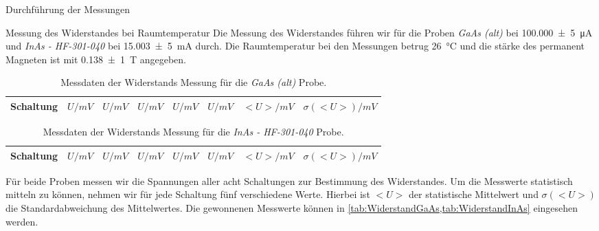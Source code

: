\documentclass[pdftex, a4paper,11pt, twoside, ngerman]{report}
\begin{document}
  \begin{chapter}{Durchführung der Messungen}
    \label{chp:Durchführung}
    
    
    
    \begin{section}{Messung des Widerstandes bei Raumtemperatur}
      \label{chp:MessungWiderstandRaumtemperatur}
      Die Messung des Widerstandes führen wir für die Proben
      \textit{GaAs (alt)} bei \SI{100,000(5)}{\micro\ampere} und
      \textit{InAs - HF-301-040} bei \SI{15,003(5)}{\milli\ampere} durch.
      Die Raumtemperatur bei den Messungen betrug \SI{26}{\celsius} und die
      stärke des permanent Magneten ist mit \SI{0,138(1)}{\tesla} angegeben.
      \begin{table}[hb]
        \centering
        \footnotesize
        \begin{tabular}{cccccccc}
          Schaltung & $U / mV$  & $U / mV$  & $U / mV$  & $U / mV$  & $U / mV$
               & $<U> / mV$  & $\sigma(<U>) / mV$ \\ \hline \hline
          
        \end{tabular}
        \caption{Messdaten der Widerstands Messung für die \textit{GaAs (alt)}
            Probe.}
        \label{tab:WiderstandGaAs}
      \end{table}
      \begin{table}[hb]
        \centering
        \footnotesize
        \begin{tabular}{cccccccc}
          Schaltung & $U / mV$  & $U / mV$  & $U / mV$  & $U / mV$  & $U / mV$
               & $<U> / mV$  & $\sigma(<U>) / mV$ \\ \hline \hline
          
        \end{tabular}
        \caption{Messdaten der Widerstands Messung für die
            \textit{InAs - HF-301-040} Probe.}
        \label{tab:WiderstandInAs}
      \end{table}
      Für beide Proben messen wir die Spannungen aller acht Schaltungen zur
      Bestimmung des Widerstandes. Um die Messwerte statistisch mitteln zu
      können, nehmen wir für jede Schaltung fünf verschiedene Werte.
      Hierbei ist $<U>$ der statistische Mittelwert und $\sigma(<U>)$ die
      Standardabweichung des Mittelwertes.
      Die gewonnenen Messwerte können in
      \cref{tab:WiderstandGaAs,tab:WiderstandInAs} eingesehen werden.
      

\end{section}
\end{chapter}
\end{document}
